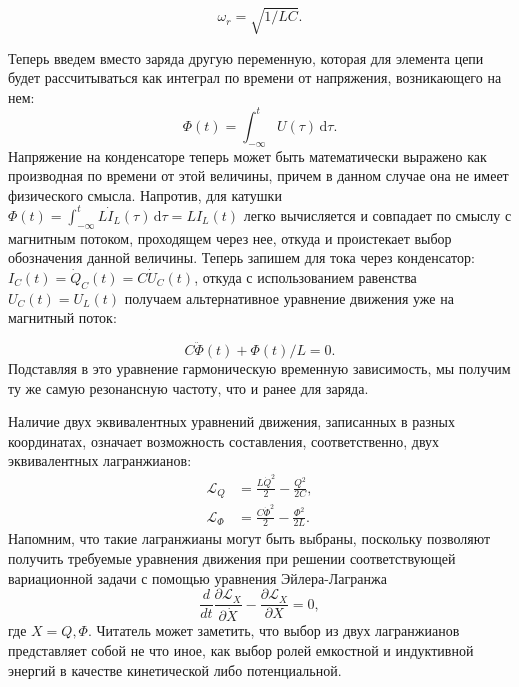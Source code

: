 \documentclass[14pt, a4paper]{extreport}
\newcommand{\diff}{\,\mathrm{d}}
\numberwithin{equation}{section}
\begin{document}
\begin{equation}
	\omega_r = \sqrt{1/LC}.
\end{equation}

Теперь введем вместо заряда другую переменную, которая для элемента цепи будет рассчитываться как интеграл по времени от напряжения, возникающего на нем:
\begin{equation}
	\Phi(t) = \int_{-\infty}^{t} U(\tau) \diff \tau.\label{eq:phi_variable}
\end{equation}
Напряжение на конденсаторе теперь может быть математически выражено как производная по времени от этой величины, причем в данном случае она не имеет физического смысла. Напротив, для катушки $\Phi(t) = \int_{-\infty}^{t} L \dot I_L(\tau) \diff \tau = LI_L(t)	$  легко вычисляется и совпадает по смыслу с магнитным потоком, проходящем через нее, откуда и проистекает выбор обозначения данной величины. Теперь запишем для тока через конденсатор: $I_C(t) = \dot Q_C(t) = C \dot U_C(t)$, откуда с использованием равенства $U_C(t) = U_L(t)$ получаем альтернативное уравнение движения уже на магнитный поток:

\begin{equation}
	C \ddot \Phi(t) + \Phi(t)/L = 0.
\end{equation}
Подставляя в это уравнение гармоническую временную зависимость, мы получим ту же самую резонансную частоту, что и ранее для заряда.

Наличие двух эквивалентных уравнений движения, записанных в разных координатах, означает возможность составления, соответственно, двух эквивалентных лагранжианов:
\begin{align}
	\mathcal{L}_Q &= \frac{L \dot Q^2}{2} - \frac{Q^2}{2 C},\\
	\mathcal{L}_\Phi &= \frac{C\dot \Phi^2}{2} - \frac{\Phi^2}{2 L}.
\end{align}
Напомним, что такие лагранжианы могут быть выбраны, поскольку позволяют получить требуемые уравнения движения при решении соответствующей вариационной задачи с помощью уравнения Эйлера-Лагранжа
\begin{equation}
\frac{d}{d t}\frac{\partial \mathcal{L}_X}{\partial \dot X} - \frac{\partial \mathcal{L}_X}{\partial X} = 0,
\end{equation}
где $X = Q, \Phi$. Читатель может заметить, что выбор из двух лагранжианов представляет собой не что иное, как выбор ролей емкостной и индуктивной энергий в качестве кинетической либо потенциальной. 
\end{document}
